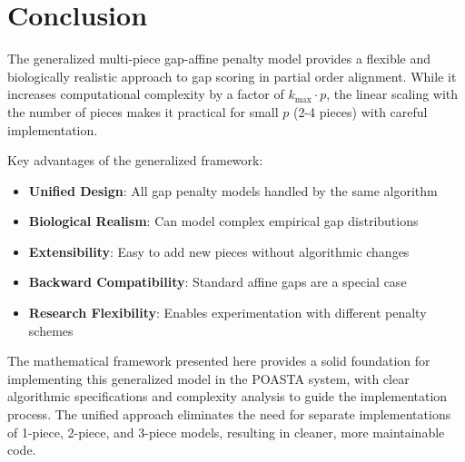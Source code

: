 \documentclass[11pt]{article}
\begin{document}
\section{Conclusion}

The generalized multi-piece gap-affine penalty model provides a flexible and biologically realistic approach to gap scoring in partial order alignment. While it increases computational complexity by a factor of $k_{\max} \cdot p$, the linear scaling with the number of pieces makes it practical for small $p$ (2-4 pieces) with careful implementation.

Key advantages of the generalized framework:
\begin{itemize}
\item \textbf{Unified Design}: All gap penalty models handled by the same algorithm
\item \textbf{Biological Realism}: Can model complex empirical gap distributions
\item \textbf{Extensibility}: Easy to add new pieces without algorithmic changes
\item \textbf{Backward Compatibility}: Standard affine gaps are a special case
\item \textbf{Research Flexibility}: Enables experimentation with different penalty schemes
\end{itemize}

The mathematical framework presented here provides a solid foundation for implementing this generalized model in the POASTA system, with clear algorithmic specifications and complexity analysis to guide the implementation process. The unified approach eliminates the need for separate implementations of 1-piece, 2-piece, and 3-piece models, resulting in cleaner, more maintainable code.
\end{document}
